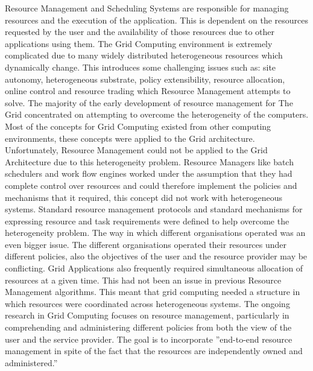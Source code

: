 \documentclass[10pt,journal,compsoc]{IEEEtran}
\begin{document}
\hspace{-0.5cm}Resource Management and Scheduling Systems are responsible for managing resources and the execution of the application. This is dependent on the resources requested by the user and the availability of those resources due to other applications using them. The Grid Computing environment is extremely complicated due to many widely distributed heterogeneous resources which dynamically change. \cite{GridOrCloud} This introduces some challenging issues such as: site autonomy, heterogeneous substrate, policy extensibility, resource allocation, online control and resource trading which Resource Management attempts to solve. \cite{book} The majority of the early development of resource management for The Grid concentrated on attempting to overcome the heterogeneity of the computers. Most of the concepts for Grid Computing existed from other computing environments, these concepts were applied to the Grid architecture. Unfortunately, Resource Management could not be applied to the Grid Architecture due to this heterogeneity problem. \newline \newline
Resource Managers like batch schedulers and work flow engines worked under the assumption that they had complete control over resources and could therefore implement the policies and mechanisms that it required, this concept did not work with heterogeneous systems. Standard resource management protocols and standard mechanisms for expressing resource and task requirements were defined to help overcome the heterogeneity problem. The way in which different organisations operated was an even bigger issue. The different organisations operated their resources under different policies, also the objectives of the user and the resource provider may be conflicting. Grid Applications also frequently required simultaneous allocation of resources at a given time. This had not been an issue in previous Resource Management algorithms. This meant that grid computing needed a structure in which resources were coordinated across heterogeneous systems. The ongoing research in Grid Computing focuses on resource management, particularly in comprehending and administering different policies from both the view of the user and the service provider. The goal is to incorporate ''end-to-end resource management in spite of the fact that the resources are independently owned and administered.'' \cite{GridNutShell} \newline \newline \newline
\end{document}
